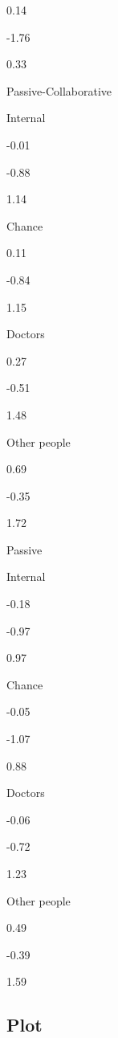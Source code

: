 \documentclass[
]{book}
\begin{document}
0.14

-1.76

0.33

Passive-Collaborative

Internal

-0.01

-0.88

1.14

Chance

0.11

-0.84

1.15

Doctors

0.27

-0.51

1.48

Other people

0.69

-0.35

1.72

Passive

Internal

-0.18

-0.97

0.97

Chance

-0.05

-1.07

0.88

Doctors

-0.06

-0.72

1.23

Other people

0.49

-0.39

1.59

\hypertarget{plot-1}{%
\subsection{Plot}\label{plot-1}}
\end{document}
